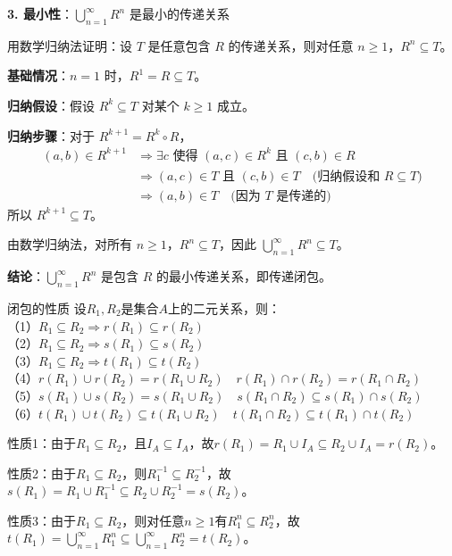 \documentclass[lang=cn,11pt]{elegantbook}
\begin{document}
\textbf{3. 最小性}：$\bigcup_{n=1}^{\infty} R^n$ 是最小的传递关系

用数学归纳法证明：设 $T$ 是任意包含 $R$ 的传递关系，则对任意 $n \geq 1$，$R^n \subseteq T$。

\textbf{基础情况}：$n=1$ 时，$R^1 = R \subseteq T$。

\textbf{归纳假设}：假设 $R^k \subseteq T$ 对某个 $k \geq 1$ 成立。

\textbf{归纳步骤}：对于 $R^{k+1} = R^k \circ R$，
\begin{align*}
(a,b) \in R^{k+1} &\Rightarrow \exists c \text{ 使得 } (a,c) \in R^k \text{ 且 } (c,b) \in R \\
&\Rightarrow (a,c) \in T \text{ 且 } (c,b) \in T \quad \text{(归纳假设和 $R \subseteq T$)} \\
&\Rightarrow (a,b) \in T \quad \text{(因为 $T$ 是传递的)}
\end{align*}
所以 $R^{k+1} \subseteq T$。

由数学归纳法，对所有 $n \geq 1$，$R^n \subseteq T$，因此 $\bigcup_{n=1}^{\infty} R^n \subseteq T$。

\textbf{结论}：$\bigcup_{n=1}^{\infty} R^n$ 是包含 $R$ 的最小传递关系，即传递闭包。
\begin{theorem}{闭包的性质}
设$R_1,R_2$是集合$A$上的二元关系，则：\\
（1）$R_1\subseteq R_2\Rightarrow r(R_1)\subseteq r(R_2)$\\
（2）$R_1\subseteq R_2\Rightarrow s(R_1)\subseteq s(R_2)$\\
（3）$R_1\subseteq R_2\Rightarrow t(R_1)\subseteq t(R_2)$\\
（4）$r(R_1)\cup r(R_2)=r(R_1\cup R_2)\quad r(R_1)\cap r(R_2)=r(R_1\cap R_2)$\\
（5）$s(R_1)\cup s(R_2)=s(R_1\cup R_2)\quad s(R_1\cap R_2)\subseteq s(R_1)\cap s(R_2)$\\
（6）$t(R_1)\cup t(R_2)\subseteq t(R_1\cup R_2)\quad t(R_1\cap R_2)\subseteq t(R_1)\cap t(R_2)$
\end{theorem}
性质1：由于$R_1 \subseteq R_2$，且$I_A \subseteq I_A$，故$r(R_1) = R_1 \cup I_A \subseteq R_2 \cup I_A = r(R_2)$。

性质2：由于$R_1 \subseteq R_2$，则$R_1^{-1} \subseteq R_2^{-1}$，故$s(R_1) = R_1 \cup R_1^{-1} \subseteq R_2 \cup R_2^{-1} = s(R_2)$。

性质3：由于$R_1 \subseteq R_2$，则对任意$n \geq 1$有$R_1^n \subseteq R_2^n$，故$t(R_1) = \bigcup_{n=1}^{\infty} R_1^n \subseteq \bigcup_{n=1}^{\infty} R_2^n = t(R_2)$。
\end{document}
